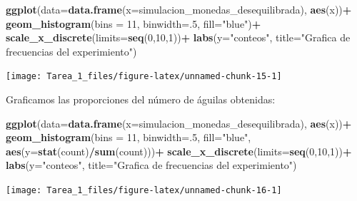 \documentclass[11pt,]{article}
\newenvironment{Shaded}{\begin{snugshade}}{\end{snugshade}}
\newcommand{\DataTypeTok}[1]{\textcolor[rgb]{0.13,0.29,0.53}{#1}}
\newcommand{\DecValTok}[1]{\textcolor[rgb]{0.00,0.00,0.81}{#1}}
\newcommand{\KeywordTok}[1]{\textcolor[rgb]{0.13,0.29,0.53}{\textbf{#1}}}
\newcommand{\NormalTok}[1]{#1}
\newcommand{\OperatorTok}[1]{\textcolor[rgb]{0.81,0.36,0.00}{\textbf{#1}}}
\newcommand{\StringTok}[1]{\textcolor[rgb]{0.31,0.60,0.02}{#1}}
\begin{document}
\begin{Shaded}
\begin{Highlighting}[]
\KeywordTok{ggplot}\NormalTok{(}\DataTypeTok{data=}\KeywordTok{data.frame}\NormalTok{(}\DataTypeTok{x=}\NormalTok{simulacion_monedas_desequilibrada), }\KeywordTok{aes}\NormalTok{(x))}\OperatorTok{+}
\KeywordTok{geom_histogram}\NormalTok{(}\DataTypeTok{bins =} \DecValTok{11}\NormalTok{, }\DataTypeTok{binwidth=}\NormalTok{.}\DecValTok{5}\NormalTok{, }\DataTypeTok{fill=}\StringTok{"blue"}\NormalTok{)}\OperatorTok{+}
\KeywordTok{scale_x_discrete}\NormalTok{(}\DataTypeTok{limits=}\KeywordTok{seq}\NormalTok{(}\DecValTok{0}\NormalTok{,}\DecValTok{10}\NormalTok{,}\DecValTok{1}\NormalTok{))}\OperatorTok{+}
\KeywordTok{labs}\NormalTok{(}\DataTypeTok{y=}\StringTok{"conteos"}\NormalTok{, }\DataTypeTok{title=}\StringTok{"Grafica de frecuencias del experimiento"}\NormalTok{)}
\end{Highlighting}
\end{Shaded}

\begin{center}\texttt{[image: Tarea\_1\_files/figure-latex/unnamed-chunk-15-1]} \end{center}

Graficamos las proporciones del número de águilas obtenidas:

\begin{Shaded}
\begin{Highlighting}[]
\KeywordTok{ggplot}\NormalTok{(}\DataTypeTok{data=}\KeywordTok{data.frame}\NormalTok{(}\DataTypeTok{x=}\NormalTok{simulacion_monedas_desequilibrada), }\KeywordTok{aes}\NormalTok{(x))}\OperatorTok{+}
\KeywordTok{geom_histogram}\NormalTok{(}\DataTypeTok{bins =} \DecValTok{11}\NormalTok{, }\DataTypeTok{binwidth=}\NormalTok{.}\DecValTok{5}\NormalTok{, }\DataTypeTok{fill=}\StringTok{"blue"}\NormalTok{, }\KeywordTok{aes}\NormalTok{(}\DataTypeTok{y=}\KeywordTok{stat}\NormalTok{(count)}\OperatorTok{/}\KeywordTok{sum}\NormalTok{(count)))}\OperatorTok{+}
\KeywordTok{scale_x_discrete}\NormalTok{(}\DataTypeTok{limits=}\KeywordTok{seq}\NormalTok{(}\DecValTok{0}\NormalTok{,}\DecValTok{10}\NormalTok{,}\DecValTok{1}\NormalTok{))}\OperatorTok{+}
\KeywordTok{labs}\NormalTok{(}\DataTypeTok{y=}\StringTok{"conteos"}\NormalTok{, }\DataTypeTok{title=}\StringTok{"Grafica de frecuencias del experimiento"}\NormalTok{)}
\end{Highlighting}
\end{Shaded}

\begin{center}\texttt{[image: Tarea\_1\_files/figure-latex/unnamed-chunk-16-1]} \end{center}
\end{document}
